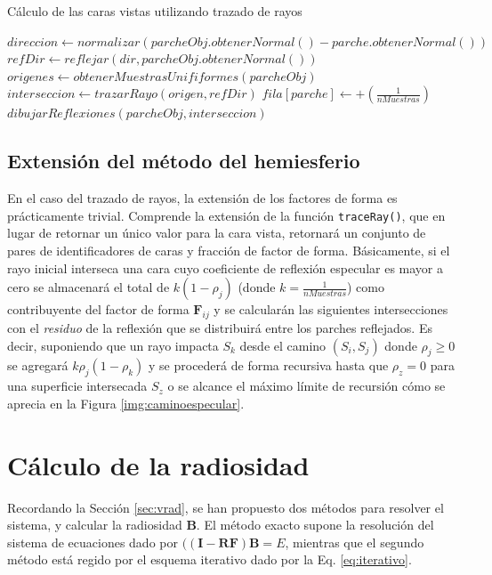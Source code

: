 \begin{algorithm}
	\caption{Cálculo de las caras vistas utilizando trazado de rayos}
	\label{alg:reflections}
	\begin{algorithmic}
			\State $direccion \gets normalizar(parcheObj.obtenerNormal() - parche.obtenerNormal())$
			\State $refDir \gets reflejar(dir, parcheObj.obtenerNormal())$
			\State $origenes \gets obtenerMuestrasUnififormes(parcheObj)$
				\State $interseccion \gets trazarRayo(origen, refDir)$
				\State $fila[parche] \gets +(\frac{1}{nMuestras})$
						\State $dibujarReflexiones(parcheObj, interseccion)$
					\EndIf
				\EndIf
			\EndLoop
		\EndFunction
	\end{algorithmic}
\end{algorithm}

\subsection{Extensión del método del hemiesferio}

En el caso del trazado de rayos, la extensión de los factores de forma es prácticamente trivial. Comprende la extensión de la función \verb|traceRay()|, que en lugar de retornar un único valor para la cara vista, retornará un conjunto de pares de identificadores de caras y fracción de factor de forma. Básicamente, si el rayo inicial interseca una cara cuyo coeficiente de reflexión especular es mayor a cero se almacenará el total de $k(1 - \rho_{j})$ (donde $k = \frac{1}{nMuestras}$) como contribuyente del factor de forma $\mathbf{F}_{ij}$ y se calcularán las siguientes intersecciones con el \textit{residuo} de la reflexión que se distribuirá entre los parches reflejados. Es decir, suponiendo que un rayo impacta $S_{k}$ desde el camino $(S_{i}, S_{j})$ donde $\rho_{j} \ge 0$ se agregará $k\rho_{j}(1 - \rho_{k})$ y se procederá de forma recursiva hasta que $\rho_{z} = 0$ para una superficie intersecada $S_{z}$ o se alcance el máximo límite de recursión cómo se aprecia en la Figura \ref{img:caminoespecular}.

\section{Cálculo de la radiosidad}

Recordando la Sección \ref{sec:vrad}, se han propuesto dos métodos para resolver el sistema, y calcular la radiosidad $\mathbf{B}$. El método exacto supone la resolución del sistema de ecuaciones dado por $(\mathbf{(I - RF)B} = E$, mientras que el segundo método está regido por el esquema iterativo dado por la Eq. \eqref{eq:iterativo}.

